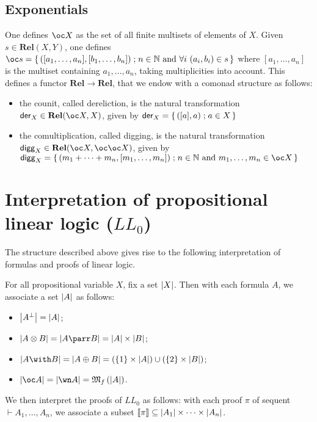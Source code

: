 \subsection{Exponentials}\label{exponentials-4}

One defines \(\oc X\) as the set of all finite multisets of elements of
\(X\). Given \(s\in\mathbf{Rel}(X,Y)\), one defines
\(\oc s=\set{([a_1,\dots,a_n],[b_1,\dots,b_n])}{n\in\mathbb N\ \text{and}\ \forall i\ (a_i,b_i)\in s}\)
where \([a_1,\dots,a_n]\) is the multiset containing \(a_1,\dots,a_n\),
taking multiplicities into account. This defines a functor
\(\mathbf{Rel}\to\mathbf{Rel}\), that we endow with a comonad structure
as follows:

\begin{itemize}
\item the counit, called dereliction, is the natural transformation
  \(\mathsf{der}_X\in\mathbf{Rel}(\oc X,X)\), given by
  \(\mathsf{der}_X=\left\{\,{([a],a)}\mathrel{;}{a\in X}\,\right\}\)
\item the comultiplication, called digging, is the natural transformation
  \(\mathsf{digg}_X\in\mathbf{Rel}(\oc X,\oc\oc X)\), given by
  \(\mathsf{digg}_X=\set{(m_1+\cdots+m_n,[m_1,\dots,m_n])}{n\in\mathbb N\ \text{and}\ m_1,\dots,m_n\in\oc X}\)
\end{itemize}

\section{\texorpdfstring{Interpretation of propositional linear logic (\(LL_0\))}{Interpretation of propositional linear logic (LL_0)}}\label{interpretation-of-propositional-linear-logic-ll_0}

The structure described above gives rise to the following interpretation
of formulas and proofs of linear logic.

For all propositional variable \(X\), fix a set \(\left|X\right|\). Then with
each formula \(A\), we associate a set \(\left|A\right|\) as follows:
\begin{itemize}
\item \(\left|A^\bot\right|=\left|A\right|\);
\item \(\web{A\tens B}=\web{A\parr B}=\web A\times\web B\);
\item \(\web{A\with B}=\web{A\plus B}=(\{1\}\times\web A)\cup(\{2\}\times\web B)\);
\item \(\web{\oc A}=\web{\wn A}=\finmulset{\web A}\).
\end{itemize}

We then interpret the proofs of \(LL_0\) as follows: with each proof
\(\pi\) of sequent \(\vdash A_1,\ldots,A_n\), we associate a subset
\(\left\llbracket \pi\right\rrbracket\subseteq\left|A_1\right|\times\cdots\times\left|A_n\right|\).

